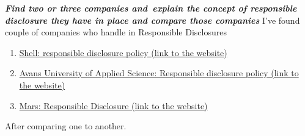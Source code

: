 \documentclass[12pt, letterpaper]{article}
\begin{document}
\hfill\break
\hfill\break
\textbf{\emph {Find two or three companies and explain the concept of responsible disclosure they have in place and compare those companies}}
\hfill\break
I've found couple of companies who handle in Responsible Disclosures
\begin{enumerate}
    \item \href{https://www.shell.com/about-us/our-values/shell-global-helpline/responsible-disclosure-policy.html}{Shell: responsible disclosure policy (link to the website)}
    \item \href{https://www.avans.nl/international/about-avans/responsible-disclosure}{Avans University of Applied Science: Responsible disclosure policy (link to the website)}
    \item \href{https://www.mars.com/about/policies-and-practices/responsible-disclosure-policy}{Mars: Responsible Disclosure (link to the website)}
\end{enumerate}
After comparing one to another.
\newpage
\end{document}
